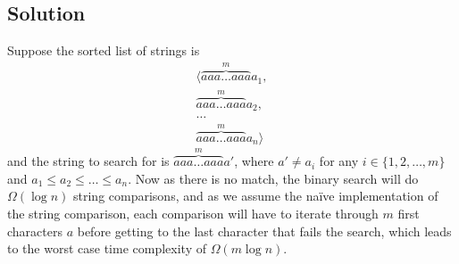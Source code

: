 \documentclass[10pt]{article}
\begin{document}
\subsection*{Solution}
Suppose the sorted list of strings is 
\begin{align*}
\langle \overbrace{aaa \dots aaa}^{m}a_1, \\
\overbrace{aaa \dots aaa}^{m}a_2, \\
\dots \\
\overbrace{aaa \dots aaa}^{m}a_n \rangle
\end{align*}
and the string to search for is $\overbrace{aaa \dots aaa}^{m}a'$, where $a' \neq a_i$ for any $i \in \{ 1, 2, \dots, m \}$ and $a_1 \leq  a_2 \leq \dots \leq a_n$. Now as there is no match, the binary search will do $\Omega(\log n)$ string comparisons, and as we assume the naïve implementation of the string comparison, each comparison will have to iterate through $m$ first characters $a$ before getting to the last character that fails the search, which leads to the worst case time complexity of $\Omega(m \log n)$.
\end{document}
